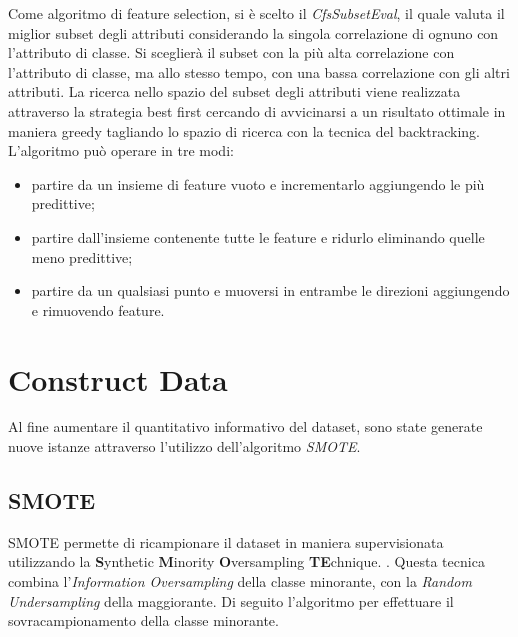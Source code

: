 Come algoritmo di feature selection, si è scelto il \textit{CfsSubsetEval}, il quale valuta il miglior subset degli attributi considerando la singola correlazione di ognuno con l'attributo di classe. Si sceglierà il subset con la più alta correlazione con l'attributo di classe, ma allo stesso tempo, con una bassa correlazione con gli altri attributi. La ricerca nello spazio del subset degli attributi viene realizzata attraverso la strategia best first cercando di avvicinarsi a un risultato ottimale in maniera greedy tagliando lo spazio di ricerca con la tecnica del backtracking.\cite{Hall1998}
L'algoritmo può operare in tre modi:
\begin{itemize}
	\item partire da un insieme di feature vuoto e incrementarlo aggiungendo le più predittive;
	\item partire dall'insieme contenente tutte le feature e ridurlo eliminando quelle meno predittive;
	\item partire da un qualsiasi punto e muoversi in entrambe le direzioni aggiungendo e rimuovendo feature.
\end{itemize}
\section{Construct Data}
Al fine aumentare il quantitativo informativo del dataset, sono state generate nuove istanze attraverso l'utilizzo dell'algoritmo \textit{SMOTE}.
\subsection{SMOTE}
\label{SMOTE}
SMOTE permette di ricampionare il dataset in maniera supervisionata utilizzando la \textbf{S}ynthetic \textbf{M}inority \textbf{O}versampling \textbf{TE}chnique. 
\cite{Chawla02smote:synthetic}. Questa tecnica combina l'\emph{Information Oversampling} della classe minorante, con la \emph{Random Undersampling} della maggiorante. Di seguito l'algoritmo per effettuare il sovracampionamento della classe minorante.

